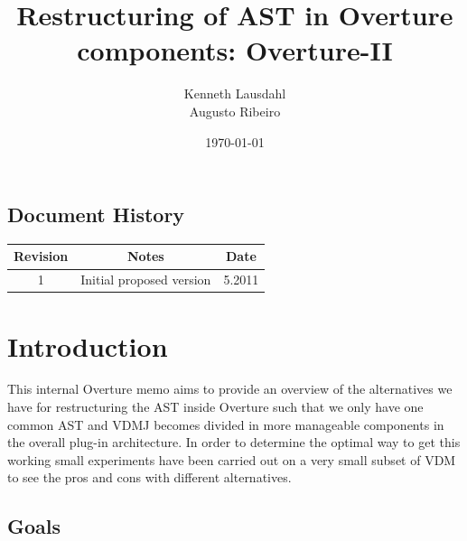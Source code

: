 \documentclass{overturerep}
\begin{document}
 
\title{Restructuring of AST in Overture components: Overture-II}
\author{Kenneth Lausdahl\\
        Augusto Ribeiro}

\date{\today}

{}     

\maketitle
\tableofcontents
\newpage


\section*{Document History}
\begin{center}
\begin{tabular}{|c|c|c|}
\hline
\textbf{Revision} & \textbf{Notes} & \textbf{Date} \\ \hline
1 & Initial proposed version& 5.2011 \\ \hline
\end{tabular}
\end{center}


\setcounter{page}{1}

\chapter{Introduction}

This internal Overture memo aims to provide an overview of the
alternatives we have for restructuring the AST inside Overture such
that we only have one common AST and VDMJ becomes divided in more
manageable components in the overall plug-in architecture. In order to
determine the optimal way to get this working small experiments have
been carried out on a very small subset of VDM to see the pros and
cons with different alternatives.

\section{Goals}
\end{document}
